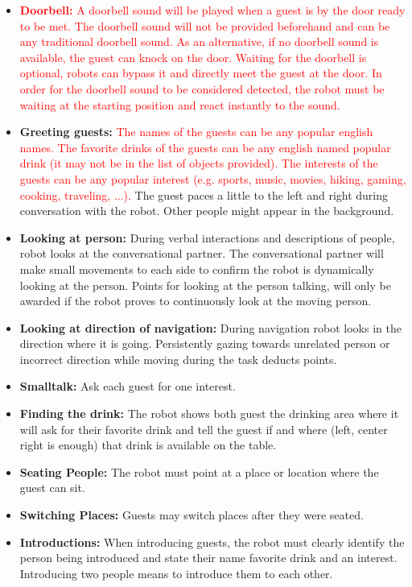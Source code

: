 \begin{itemize}

	\item \textcolor{red}{ \textbf{Doorbell:} A doorbell sound will be played when a guest is by the door ready to be met. The doorbell sound will not be provided beforehand and can be any traditional doorbell sound. As an alternative, if no doorbell sound is available, the guest can knock on the door. Waiting for the doorbell is optional, robots can bypass it and directly meet the guest at the door. In order for the doorbell sound to be considered detected, the robot must be waiting at the starting position and react instantly to the sound.} 
	
	\item \textbf{Greeting guests:} \textcolor{red}{The names of the guests can be any popular english names. The favorite drinks of the guests can be any english named popular drink (it may not be in the list of objects provided). The interests of the guests can be any popular interest (e.g. sports, music, movies, hiking, gaming, cooking, traveling, ...).}
	The guest paces a little to the left and right during conversation with the robot. Other people might appear in the background. 
	
	\item \textbf{Looking at person:} During verbal interactions and descriptions of people, robot 
	looks at the conversational partner. The conversational partner will make small movements to each side to confirm the robot is dynamically looking at the person. Points for looking at the person talking, will only be awarded if the robot proves to continuously look at the moving person. 
	
	\item \textbf{Looking at direction of navigation:} During navigation robot looks in the direction where it is going. Persistently gazing towards unrelated person or incorrect direction while moving during the task deducts points. 
    
    \item \textbf{Smalltalk:} Ask each guest for one interest.
    
    \item \textbf{Finding the drink:} The robot shows both guest the drinking area where it will ask for their favorite drink and tell the guest if and where (left, center right is enough) that drink is available on the table. 
	
	\item \textbf{Seating People:} The robot must point at a place or location where the guest can sit.
	
	\item \textbf{Switching Places:} Guests may switch places after they were seated.
	
	\item \textbf{Introductions:} When introducing guests, the robot must clearly identify the person being introduced and state their name favorite drink and an interest. Introducing two people means to introduce them to each other.
\end{itemize}

